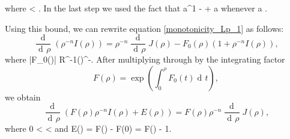 \documentclass[a4paper, 11pt]{article}
\theoremstyle{plain}
\theoremstyle{definition}
\theoremstyle{remark}
\DeclareMathOperator{\diff}{d \!}
\numberwithin{equation}{subsection}
\def\({}
\def\){}
\begin{document}
where \(\rho < \). In the last step we used the fact that \(a^{1 - }  + a\) whenever \(a \).

Using this bound, we can rewrite equation \eqref{monotonicity_Lp_1} as follows:
\begin{equation}
\frac{\!\diff}{\diff\rho}(\rho^{-n}I(\rho)) = \rho^{-n}\frac{\!\diff}{\diff\rho}J(\rho) - F_0(\rho)(1 + \rho^{-n}I(\rho)),
\end{equation}
where \(|F_0(\rho)| \kappa\Lambda R^{-1}\left(\right)^{-}\). After multiplying through by the integrating factor
\begin{equation}
F(\rho) = \exp\left(\int_{0}^{\rho}F_0(t)\diff t\right),
\end{equation}
we obtain
\begin{equation}
\frac{\!\diff}{\diff\rho}(F(\rho)\rho^{-n}I(\rho) + E(\rho)) = F(\rho)\rho^{-n}\frac{\!\diff}{\diff\rho}J(\rho),
\end{equation}
where \(0 < \rho < \) and \(E(\rho) = F(\rho) - F(0) = F(\rho) - 1\).
\end{document}
